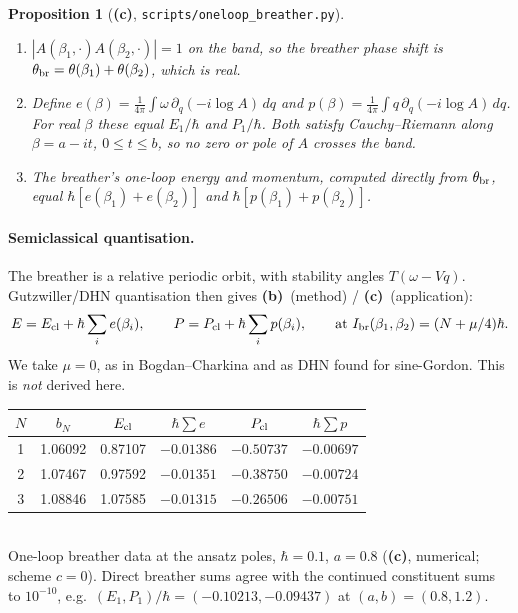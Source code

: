 \documentclass[11pt,a4paper]{article}
\newcommand{\Lb}{\textsf{\textbf{(b)}}}
\newcommand{\Lc}{\textsf{\textbf{(c)}}}
\newcommand{\script}[1]{\texttt{scripts/#1}}
\newtheorem{proposition}{Proposition}[section]
\theoremstyle{remark}\newtheorem{remark}[proposition]{Remark}
\begin{document}
\begin{proposition}[\Lc, \script{oneloop\_breather.py}]\label{prop:br}
\begin{enumerate}
\item $|A(\beta_1,\cdot)A(\beta_2,\cdot)|=1$ on the band, so the breather phase shift is $\theta_{\rm br}=\theta(\beta_1)+\theta(\beta_2)$, which is real.
\item Define $e(\beta)=\frac1{4\pi}\int\omega\,\partial_q(-i\log A)\,dq$ and $p(\beta)=\frac1{4\pi}\int q\,\partial_q(-i\log A)\,dq$. For real $\beta$ these equal $E_1/\hbar$ and $P_1/\hbar$. Both satisfy Cauchy--Riemann along $\beta=a-it$, $0\le t\le b$, so no zero or pole of $A$ crosses the band.
\item The breather's one-loop energy and momentum, computed directly from $\theta_{\rm br}$, equal $\hbar[e(\beta_1)+e(\beta_2)]$ and $\hbar[p(\beta_1)+p(\beta_2)]$.
\end{enumerate}
\end{proposition}

\paragraph{Semiclassical quantisation.} The breather is a relative periodic orbit, with stability angles $T(\omega-Vq)$. Gutzwiller/DHN quantisation then gives \Lb\ (method) / \Lc\ (application):
\[
E=E_{\rm cl}+\hbar\sum_i e(\beta_i),\qquad P=P_{\rm cl}+\hbar\sum_i p(\beta_i),\qquad\text{at } I_{\rm br}(\beta_1,\beta_2)=(N+\mu/4)\hbar .
\]
We take $\mu=0$, as in Bogdan--Charkina \cite{BC} and as DHN found for sine-Gordon. This is \emph{not} derived here.

\begin{center}\small
\begin{tabular}{@{}cccccc@{}}\toprule
$N$ & $b_N$ & $E_{\rm cl}$ & $\hbar\sum e$ & $P_{\rm cl}$ & $\hbar\sum p$\\\midrule
1 & 1.06092 & 0.87107 & $-0.01386$ & $-0.50737$ & $-0.00697$\\
2 & 1.07467 & 0.97592 & $-0.01351$ & $-0.38750$ & $-0.00724$\\
3 & 1.08846 & 1.07585 & $-0.01315$ & $-0.26506$ & $-0.00751$\\\bottomrule
\end{tabular}\\[2pt]
One-loop breather data at the ansatz poles, $\hbar=0.1$, $a=0.8$ (\Lc, numerical; scheme $c=0$).
Direct breather sums agree with the continued constituent sums to $10^{-10}$, e.g.\ $(E_1,P_1)/\hbar=(-0.10213,-0.09437)$ at $(a,b)=(0.8,1.2)$.
\end{center}
\end{document}

